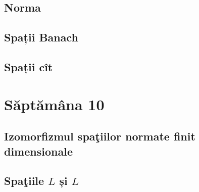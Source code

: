 \documentclass[a4paper,12pt]{article}
\theoremstyle{change}
\begin{document}

\subsection{Norma}


\subsection{Spații Banach}

\subsection{Spații cît}

\section{Săptămâna 10}


\subsection{Izomorfizmul spaţiilor normate finit dimensionale}

\subsection{Spaţiile $L$ și $L$}
\end{document}
